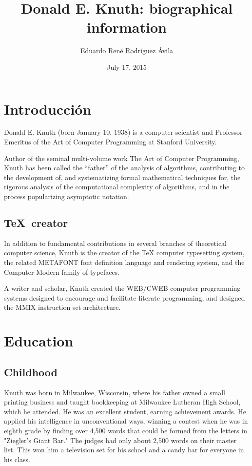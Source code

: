 \documentclass[10pt,letterpaper]{book}
\title{Donald E. Knuth: biographical information}
\author{Eduardo René Rodríguez Ávila}
\date{July 17, 2015}
\begin{document}
\frontmatter
\maketitle
\tableofcontents

\chapter{Introducción}

Donald E. Knuth (born January 10, 1938) is a computer scientist 
and Professor Emeritus of the Art of Computer Programming at 
Stanford University.

Author of the seminal multi-volume work The Art of Computer Programming, 
Knuth has been called the ``father'' of the analysis of algorithms, 
contributing to the development of, and systematizing formal mathematical 
techniques for, the rigorous analysis of the computational complexity of 
algorithms, and in the process popularizing asymptotic notation.

\section*{\TeX\ creator}

In addition to fundamental contributions in several branches of theoretical 
computer science, Knuth is the creator of the TeX computer typesetting 
system, the related METAFONT font definition language and rendering system, 
and the Computer Modern family of typefaces.

A writer and scholar, Knuth created the WEB/CWEB computer programming 
systems designed to encourage and facilitate literate programming, 
and designed the MMIX instruction set architecture.

\mainmatter
	\chapter{Education}
		\section{Childhood}

Knuth was born in Milwaukee, Wisconsin, where his father owned a small 
printing business and taught bookkeeping at Milwaukee Lutheran High 
School, which he attended. He was an excellent student, earning achievement 
awards. He applied his intelligence in unconventional ways, winning a contest 
when he was in eighth grade by finding over 4,500 words that could be formed 
from the letters in "Ziegler's Giant Bar." The judges had only about 
2,500 words on their master list. This won him a television set for his school 
and a candy bar for everyone in his class.
\end{document}

